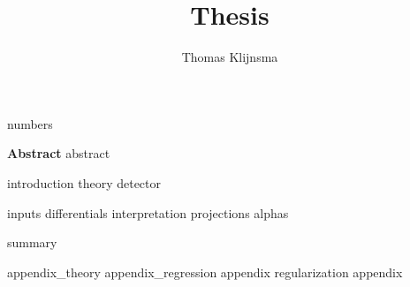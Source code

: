 \documentclass[draftmode]{main}
\begin{document}
\title{Thesis}
\author{Thomas Klijnsma}
\maketitle

{numbers}

\textbf{Abstract}
{abstract}

\tableofcontents

{introduction}
{theory}
{detector}

{inputs}
{differentials}
{interpretation}
{projections}
{alphas}

{summary}




\appendix
{appendix_theory}
{appendix_regression}
{appendix}
{regularization}
{appendix}
\end{document}
